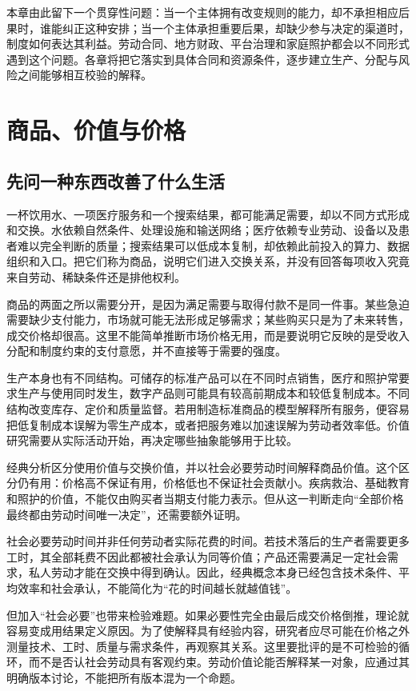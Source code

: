 \documentclass[UTF8,fontset=fandol,zihao=-4,oneside,openany]{ctexbook}
\begin{document}
本章由此留下一个贯穿性问题：当一个主体拥有改变规则的能力，却不承担相应后果时，谁能纠正这种安排；当一个主体承担重要后果，却缺少参与决定的渠道时，制度如何表达其利益。劳动合同、地方财政、平台治理和家庭照护都会以不同形式遇到这个问题。各章将把它落实到具体合同和资源条件，逐步建立生产、分配与风险之间能够相互校验的解释。


\chapter{商品、价值与价格}
\section{先问一种东西改善了什么生活}
一杯饮用水、一项医疗服务和一个搜索结果，都可能满足需要，却以不同方式形成和交换。水依赖自然条件、处理设施和输送网络；医疗依赖专业劳动、设备以及患者难以完全判断的质量；搜索结果可以低成本复制，却依赖此前投入的算力、数据组织和入口。把它们称为商品，说明它们进入交换关系，并没有回答每项收入究竟来自劳动、稀缺条件还是排他权利。

\label{arg:P037}
商品的两面之所以需要分开，是因为满足需要与取得付款不是同一件事。某些急迫需要缺少支付能力，市场就可能无法形成足够需求；某些购买只是为了未来转售，成交价格却很高。这里不能简单推断市场价格无用，而是要说明它反映的是受收入分配和制度约束的支付意愿，并不直接等于需要的强度。

生产本身也有不同结构。可储存的标准产品可以在不同时点销售，医疗和照护常要求生产与使用同时发生，数字产品则可能具有较高前期成本和较低复制成本。不同结构改变库存、定价和质量监督。若用制造标准商品的模型解释所有服务，便容易把低复制成本误解为零生产成本，或者把服务难以加速误解为劳动者效率低。价值研究需要从实际活动开始，再决定哪些抽象能够用于比较。

经典分析区分使用价值与交换价值，并以社会必要劳动时间解释商品价值。这个区分仍有用：价格高不保证有用，价格低也不保证社会贡献小。疾病救治、基础教育和照护的价值，不能仅由购买者当期支付能力表示。但从这一判断走向“全部价格最终都由劳动时间唯一决定”，还需要额外证明。\cite{Marx1}

\label{arg:P038}
社会必要劳动时间并非任何劳动者实际花费的时间。若技术落后的生产者需要更多工时，其全部耗费不因此都被社会承认为同等价值；产品还需要满足一定社会需求，私人劳动才能在交换中得到确认。因此，经典概念本身已经包含技术条件、平均效率和社会承认，不能简化为“花的时间越长就越值钱”。\cite{Marx1}

但加入“社会必要”也带来检验难题。如果必要性完全由最后成交价格倒推，理论就容易变成用结果定义原因。为了使解释具有经验内容，研究者应尽可能在价格之外测量技术、工时、质量与需求条件，再观察其关系。这里要批评的是不可检验的循环，而不是否认社会劳动具有客观约束。劳动价值论能否解释某一对象，应通过其明确版本讨论，不能把所有版本混为一个命题。
\end{document}

